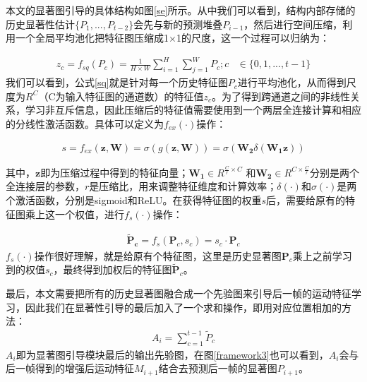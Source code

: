本文的显著图引导的具体结构如图\ref{se}所示。从中我们可以看到，结构内部存储的历史显著性估计$\{P_1, ..., P_{t-2}\}$会先与新的预测堆叠$P_{i-1}$，然后进行空间压缩，利用一个全局平均池化把特征图压缩成1$\times$1的尺度，这一个过程可以归纳为：

\begin{equation}
\label{sq}
\begin{aligned}
   z_{c} =f_{sq}(P_c) = \frac{1}{H \times W} \sum\limits_{i=1}^{H} \sum\limits_{j=1}^{W} P_c; c &\in \{0,1,...,t-1\}
 \end{aligned}
\end{equation} 我们可以看到，公式\ref{sq}就是针对每一个历史特征图$P_{c}$进行平均池化，从而得到尺度为$R^C$（C为输入特征图的通道数）的特征值$z_{c}$。为了得到跨通道之间的非线性关系，学习非互斥信息，因此压缩后的特征值需要使用到一个两层全连接计算和相应的分线性激活函数。具体可以定义为$f_{ex}(\cdot)$操作：

\begin{equation}
\label{ex}
\begin{aligned}
   s = f_{ex}(\bm{z}, \textbf{W}) = \sigma(g(\bm{z}, \bm{W})) = \sigma(\bm{W_2}\delta(\bm{W_1}\bm{z}))
 \end{aligned}
\end{equation} 

其中，$\bm{z}$即为压缩过程中得到的特征向量；$\bm{W_1} \in R^{\frac{C}{r}\times C} $ 和$\bm{W_2} \in R^{C\times \frac{C}{r}} $分别是两个全连接层的参数，$r$是压缩比，用来调整特征维度和计算效率；$\delta(\cdot)$和$\sigma(\cdot)$是两个激活函数，分别是sigmoid和ReLU。在获得特征图的权重$s$后，需要给原有的特征图乘上这一个权值，进行$f_s(\cdot)$操作：

\begin{equation}
\label{scale}
\begin{aligned}
   \bm{\tilde{P}_c} = f_{s}(\bm{P}_c, s_c) = s_c \cdot \textbf{P}_c
\end{aligned}
\end{equation} $f_s(\cdot)$操作很好理解，就是给原有个特征图，这里是历史显著图$\bm{P}_c$乘上之前学习到的权值$s_c$，最终得到加权后的特征图$\bm{\tilde{P}}_c$。

最后，本文需要把所有的历史显著图融合成一个先验图来引导后一帧的运动特征学习，因此我们在显著性引导的最后加入了一个求和操作，即用对应位置相加的方法：
\begin{equation}
\label{sum_scale}
\begin{aligned}
   A_i = \sum\limits_{c=1}^{t-1}\tilde{P}_c
 \end{aligned}
\end{equation} $A_i$即为显著图引导模块最后的输出先验图，在图\ref{framework3}也可以看到，$A_i$会与后一帧得到的增强后运动特征$M_{i+1}$结合去预测后一帧的显著图$P_{i+1}$。


